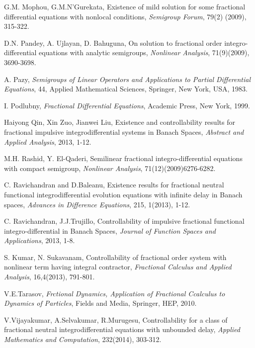 \documentclass[11pt]{article}
\begin{document}
\begin{thebibliography}{USA00}
G.M. Mophou, G.M.N'Gurekata, Existence of mild solution for some fractional differential equations with nonlocal conditions, {\it Semigroup Forum}, 79(2) (2009), 315-322.

 D.N. Pandey, A. Ujlayan, D. Bahuguna, On solution to fractional order integro-differential equations with analytic semigroups, {\it Nonlinear Analysis}, 71(9)(2009), 3690-3698.

 A. Pazy, {\it Semigroups of Linear Operators and Applications to Partial Differential Equations}, 44, Applied Mathematical Sciences, Springer, New York, USA, 1983.

 I. Podlubny, {\it Fractional Differential Equations}, Academic Press, New York, 1999.

Haiyong Qin, Xin Zuo, Jianwei Liu, Existence and controllability results for fractional impulsive integrodifferential systems in Banach Spaces, {\it Abstract and Applied Analysis}, 2013, 1-12.

M.H. Rashid, Y. El-Qaderi, Semilinear fractional integro-differential equations with compact semigroup, {\it Nonlinear Analysis}, 71(12)(2009)6276-6282.

C. Ravichandran and D.Baleanu, Existence results for fractional neutral functional integrodifferential evolution equations with infinite delay in Banach spaces, {\it Advances in Difference Equations}, 215, 1(2013), 1-12.

 C. Ravichandran, J.J.Trujillo, Controllability of impulsive fractional functional integro-differential in Banach Spaces, {\it Journal of Function Spaces and Applications}, 2013, 1-8.



 S. Kumar, N. Sukavanam, Controllability of fractional order system with nonlinear term having integral contractor, {\it Fractional Calculus and Applied Analysis}, 16,4(2013), 791-801.





 V.E.Tarasov, {\it Frctional Dynamics, Application of Fractional Ccalculus to Dynamics of Particles}, Fields and Media, Springer, HEP, 2010.

V.Vijayakumar, A.Selvakumar, R.Murugesu, Controllability for a class of fractional neutral integrodifferential equations with unbounded delay, {\it Applied Mathematics and Computation}, 232(2014), 303-312.


\end{thebibliography}
\end{document}
